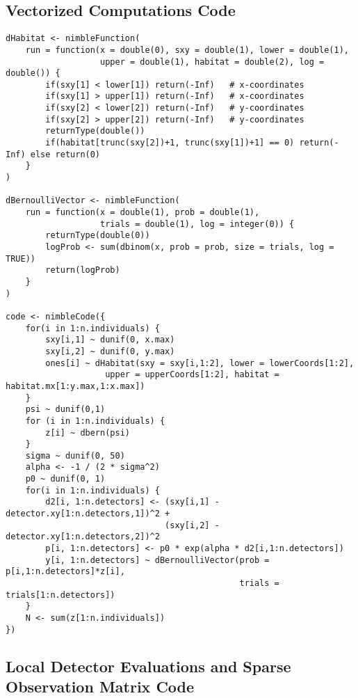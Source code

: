 \subsection{Vectorized Computations Code}

\begin{singlespace}
\begin{small}
\begin{verbatim}
dHabitat <- nimbleFunction(
    run = function(x = double(0), sxy = double(1), lower = double(1),
                   upper = double(1), habitat = double(2), log = double()) {
        if(sxy[1] < lower[1]) return(-Inf)   # x-coordinates
        if(sxy[1] > upper[1]) return(-Inf)   # x-coordinates
        if(sxy[2] < lower[2]) return(-Inf)   # y-coordinates
        if(sxy[2] > upper[2]) return(-Inf)   # y-coordinates
        returnType(double())
        if(habitat[trunc(sxy[2])+1, trunc(sxy[1])+1] == 0) return(-Inf) else return(0)
    }
)

dBernoulliVector <- nimbleFunction(
    run = function(x = double(1), prob = double(1), 
                   trials = double(1), log = integer(0)) {
        returnType(double(0))
        logProb <- sum(dbinom(x, prob = prob, size = trials, log = TRUE))
        return(logProb)
    }
)

code <- nimbleCode({
    for(i in 1:n.individuals) {
        sxy[i,1] ~ dunif(0, x.max)
        sxy[i,2] ~ dunif(0, y.max)
        ones[i] ~ dHabitat(sxy = sxy[i,1:2], lower = lowerCoords[1:2], 
                    upper = upperCoords[1:2], habitat = habitat.mx[1:y.max,1:x.max])
    }
    psi ~ dunif(0,1)
    for (i in 1:n.individuals) {
        z[i] ~ dbern(psi)
    }
    sigma ~ dunif(0, 50)
    alpha <- -1 / (2 * sigma^2)
    p0 ~ dunif(0, 1)
    for(i in 1:n.individuals) {
        d2[i, 1:n.detectors] <- (sxy[i,1] - detector.xy[1:n.detectors,1])^2 + 
                                (sxy[i,2] - detector.xy[1:n.detectors,2])^2
        p[i, 1:n.detectors] <- p0 * exp(alpha * d2[i,1:n.detectors])
        y[i, 1:n.detectors] ~ dBernoulliVector(prob = p[i,1:n.detectors]*z[i], 
                                               trials =  trials[1:n.detectors])
    }
    N <- sum(z[1:n.individuals])
})
\end{verbatim}
\end{small}
\end{singlespace}




\newpage
\subsection{Local Detector Evaluations and Sparse Observation Matrix Code}

